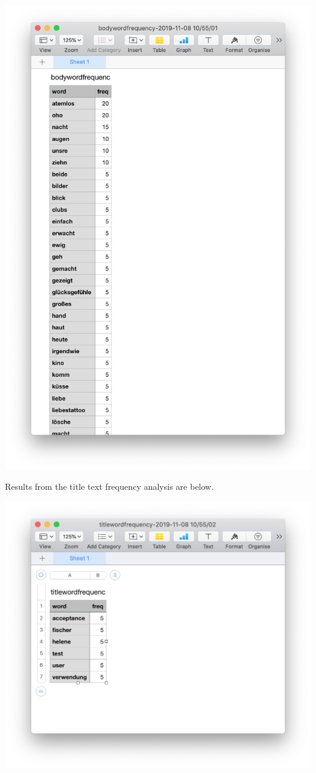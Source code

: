 \documentclass{article}
\begin{document}
\includegraphics[width=\textwidth]{uat07.png}

Results from the title text frequency analysis are below.

\includegraphics[width=\textwidth]{uat08.png}
\end{document}
